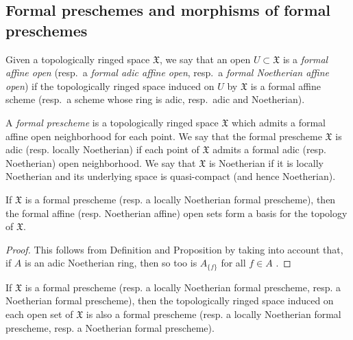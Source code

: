 \subsection{Formal preschemes and morphisms of formal preschemes}
\label{subsection:1.10.4}

\begin{env}[10.4.1]
\label{1.10.4.1}
Given a topologically ringed space $\mathfrak{X}$, we say that an open $U\subset\mathfrak{X}$ is a \emph{formal affine open} (resp.~a \emph{formal adic affine open}, resp.~a \emph{formal Noetherian affine open}) if the topologically ringed space induced on $U$ by $\mathfrak{X}$ is a formal affine scheme (resp.~a scheme whose ring is adic, resp.~adic and Noetherian).
\end{env}

\begin{defn}[10.4.2]
\label{1.10.4.2}
A \emph{formal prescheme} is a topologically ringed space $\mathfrak{X}$ which admits a formal affine open neighborhood for each point.
We say that the formal prescheme $\mathfrak{X}$ is adic (resp. locally Noetherian) if each point of $\mathfrak{X}$ admits a formal adic (resp. Noetherian) open neighborhood.
We say that $\mathfrak{X}$ is Noetherian if it is locally Noetherian and its underlying space is quasi-compact (and hence Noetherian).
\end{defn}

\begin{prop}[10.4.3]
\label{1.10.4.3}
If $\mathfrak{X}$ is a formal prescheme (resp. a locally Noetherian formal prescheme), then the formal affine (resp. Noetherian affine) open sets form a basis for the topology of $\mathfrak{X}$.
\end{prop}

\begin{proof}
\label{proof-1.10.4.3}
This follows from Definition  and Proposition  by taking into account that, if $A$ is an adic Noetherian ring, then so too is $A_{\{f\}}$ for all $f\in A$ .
\end{proof}

\begin{cor}[10.4.4]
\label{1.10.4.4}
If $\mathfrak{X}$ is a formal prescheme (resp. a locally Noetherian formal prescheme, resp. a Noetherian formal prescheme), then the topologically ringed space induced on each open set of $\mathfrak{X}$ is also a formal prescheme (resp. a locally Noetherian formal prescheme, resp. a Noetherian formal prescheme).
\end{cor}

